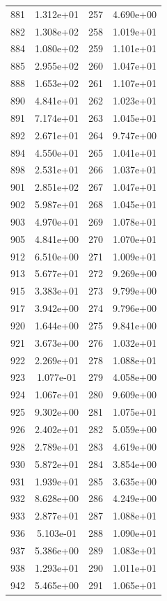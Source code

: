 \documentclass[12pt]{article}
\begin{document}
\begin{longtable}{@{}cccc@{}}
881 & 1.312e+01 & 257 & 4.690e+00 \\
882 & 1.308e+02 & 258 & 1.019e+01 \\
884 & 1.080e+02 & 259 & 1.101e+01 \\
885 & 2.955e+02 & 260 & 1.047e+01 \\
888 & 1.653e+02 & 261 & 1.107e+01 \\
890 & 4.841e+01 & 262 & 1.023e+01 \\
891 & 7.174e+01 & 263 & 1.045e+01 \\
892 & 2.671e+01 & 264 & 9.747e+00 \\
894 & 4.550e+01 & 265 & 1.041e+01 \\
898 & 2.531e+01 & 266 & 1.037e+01 \\
901 & 2.851e+02 & 267 & 1.047e+01 \\
902 & 5.987e+01 & 268 & 1.045e+01 \\
903 & 4.970e+01 & 269 & 1.078e+01 \\
905 & 4.841e+00 & 270 & 1.070e+01 \\
912 & 6.510e+00 & 271 & 1.009e+01 \\
913 & 5.677e+01 & 272 & 9.269e+00 \\
915 & 3.383e+01 & 273 & 9.799e+00 \\
917 & 3.942e+00 & 274 & 9.796e+00 \\
920 & 1.644e+00 & 275 & 9.841e+00 \\
921 & 3.673e+00 & 276 & 1.032e+01 \\
922 & 2.269e+01 & 278 & 1.088e+01 \\
923 & 1.077e-01 & 279 & 4.058e+00 \\
924 & 1.067e+01 & 280 & 9.609e+00 \\
925 & 9.302e+00 & 281 & 1.075e+01 \\
926 & 2.402e+01 & 282 & 5.059e+00 \\
928 & 2.789e+01 & 283 & 4.619e+00 \\
930 & 5.872e+01 & 284 & 3.854e+00 \\
931 & 1.939e+01 & 285 & 3.635e+00 \\
932 & 8.628e+00 & 286 & 4.249e+00 \\
933 & 2.877e+01 & 287 & 1.088e+01 \\
936 & 5.103e-01 & 288 & 1.090e+01 \\
937 & 5.386e+00 & 289 & 1.083e+01 \\
938 & 1.293e+01 & 290 & 1.011e+01 \\
942 & 5.465e+00 & 291 & 1.065e+01 \\

\end{longtable}
\end{document}
